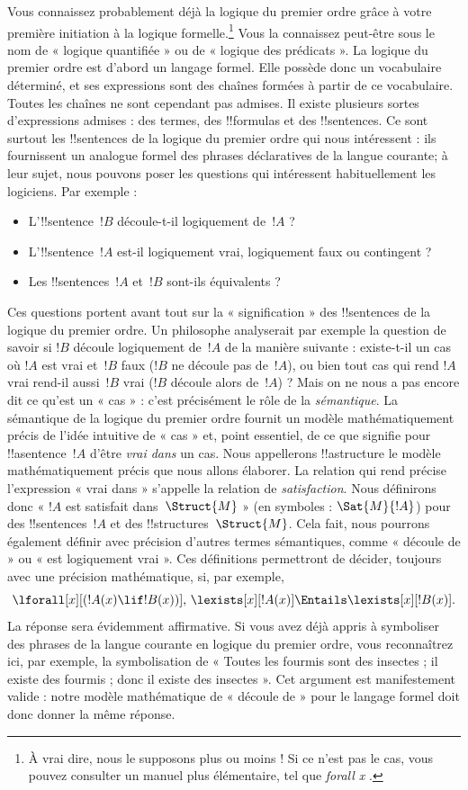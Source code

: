 \documentclass[11pt,a4paper,openany]{memoir}
\begin{document}
Vous connaissez probablement déjà la logique du premier ordre grâce à
votre première initiation à la logique formelle.\footnote{À vrai dire,
nous le supposons plus ou moins !{} Si ce n'est pas le cas, vous pouvez
consulter un manuel plus élémentaire, tel que \emph{forall x}
\citep{Magnus2021}.} Vous la connaissez peut-être sous le nom de
« logique quantifiée » ou de « logique des prédicats ». La logique du
premier ordre est d'abord un langage formel. Elle possède donc un
vocabulaire déterminé, et ses expressions sont des chaînes formées à
partir de ce vocabulaire. Toutes les chaînes ne sont cependant pas
admises. Il existe plusieurs sortes d'expressions admises : des termes,
des !!{formula}s et des !!{sentence}s. Ce sont surtout les
!!{sentence}s de la logique du premier ordre qui nous intéressent : ils
fournissent un analogue formel des phrases déclaratives de la langue
courante; à leur sujet, nous pouvons poser les questions qui intéressent
habituellement les logiciens. Par exemple :
\begin{itemize}
    \item L'!!{sentence}~$!B$ découle-t-il logiquement de~$!A$ ?
    \item L'!!{sentence}~$!A$ est-il logiquement vrai, logiquement faux
      ou contingent ?
    \item Les !!{sentence}s~$!A$ et~$!B$ sont-ils équivalents ?
\end{itemize}

Ces questions portent avant tout sur la « signification » des
!!{sentence}s de la logique du premier ordre. Un philosophe analyserait
par exemple la question de savoir si $!B$ découle logiquement de~$!A$ de
la manière suivante : existe-t-il un cas où $!A$ est vrai et~$!B$ faux
($!B$ ne découle pas de~$!A$), ou bien tout cas qui rend $!A$ vrai
rend-il aussi~$!B$ vrai ($!B$ découle alors de~$!A$) ? Mais on ne nous a
pas encore dit ce qu'est un « cas » : c'est précisément le rôle de la
\emph{sémantique}. La sémantique de la logique du premier ordre fournit
un modèle mathématiquement précis de l'idée intuitive de « cas » et,
point essentiel, de ce que signifie pour !!a{sentence}~$!A$ d'être
\emph{vrai dans} un cas. Nous appellerons !!a{structure} le modèle
mathématiquement précis que nous allons élaborer. La relation qui rend
précise l'expression « vrai dans » s'appelle la relation de
\emph{satisfaction}. Nous définirons donc « $!A$ est satisfait
dans~$\Struct{M}$ » (en symboles : $\Sat{M}{!A}$) pour des
!!{sentence}s~$!A$ et des !!{structure}s~$\Struct{M}$. Cela fait, nous
pourrons également définir avec précision d'autres termes sémantiques,
comme « découle de » ou « est logiquement vrai ». Ces définitions
permettront de décider, toujours avec une précision mathématique, si,
par exemple,
\[
  \lforall[x][(!A(x) \lif !B(x))],\,
  \lexists[x][!A(x)] \Entails \lexists[x][!B(x)].
\]
La réponse sera évidemment affirmative. Si vous avez déjà appris à
symboliser des phrases de la langue courante en logique du premier
ordre, vous reconnaîtrez ici, par exemple, la symbolisation de
« Toutes les fourmis sont des insectes ; il existe des fourmis ; donc
il existe des insectes ». Cet argument est manifestement valide : notre
modèle mathématique de « découle de » pour le langage formel doit donc
donner la même réponse.
\end{document}
